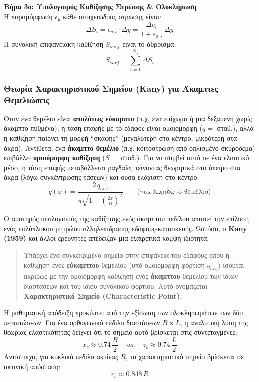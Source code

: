 \documentclass[11pt,a4paper]{article}
\begin{document}
\textbf{Βήμα 3ο: Υπολογισμός Καθίζησης Στρώσης \& Ολοκλήρωση}\\
Η παραμόρφωση $\epsilon_y$ κάθε στοιχειώδους στρώσης είναι:
\begin{equation}
  \Delta S_i = \epsilon_{y,i}\cdot\Delta y = \frac{\Delta e_i}{1+e_{0,i}}\,\Delta y
\end{equation}
Η συνολική επιφανειακή καθίζηση $S_{surf}$ είναι το άθροισμα:
\begin{equation}
  S_{surf} = \sum_{i=1}^{N_y} \Delta S_i
\end{equation}

\subsubsection{Θεωρία Χαρακτηριστικού Σημείου (Kany) για Άκαμπτες Θεμελιώσεις}\label{sec:kany}

Όταν ένα θεμέλιο είναι \textbf{απολύτως εύκαμπτο} (π.χ. ένα επίχωμα ή μια δεξαμενή χωρίς άκαμπτο πυθμένα), η τάση επαφής με το έδαφος είναι ομοιόμορφη ($q =$ σταθ.), αλλά η καθίζηση παίρνει τη μορφή ``σκάφης'' (μεγαλύτερη στο κέντρο, μικρότερη στα άκρα). Αντίθετα, ένα \textbf{άκαμπτο θεμέλιο} (π.χ. κοιτόστρωση από οπλισμένο σκυρόδεμα) επιβάλλει \textbf{ομοιόμορφη καθίζηση} ($S =$ σταθ.). Για να συμβεί αυτό σε ένα ελαστικό μέσο, η τάση επαφής μεταβάλλεται ραγδαία, τείνοντας θεωρητικά στο άπειρο στα άκρα (λόγω συγκέντρωσης τάσεων) και ούσα ελάχιστη στο κέντρο:
\begin{equation}
  q(x) = \frac{2\,q_{avg}}{\pi\sqrt{1-\left(\frac{2x}{B}\right)^2}} \qquad \text{(για λωριδωτό θεμέλιο)}
\end{equation}

Ο αυστηρός υπολογισμός της καθίζησης ενός άκαμπτου πεδίλου απαιτεί την επίλυση ενός πολύπλοκου μητρώου αλληλεπίδρασης εδάφους-κατασκευής. Ωστόσο, ο \textbf{Kany (1959)} και άλλοι ερευνητές απέδειξαν μια εξαιρετικά κομψή ιδιότητα:
\begin{quote}
  Υπάρχει ένα συγκεκριμένο σημείο στην επιφάνεια του εδάφους όπου η καθίζηση ενός \textbf{εύκαμπτου} θεμελίου (υπό ομοιόμορφη φόρτιση $q_{avg}$) ισούται ακριβώς με την ομοιόμορφη καθίζηση ενός \textbf{άκαμπτου} θεμελίου των ίδιων διαστάσεων και του ίδιου συνολικού φορτίου. Αυτό ονομάζεται \textbf{Χαρακτηριστικό Σημείο (Characteristic Point)}.
\end{quote}

Η μαθηματική απόδειξη προκύπτει από την εξίσωση των ολοκληρωμάτων των δύο περιπτώσεων. Για ένα ορθογωνικό πέδιλο διαστάσεων $B\times L$, η αναλυτική λύση της θεωρίας ελαστικότητας δείχνει ότι το σημείο αυτό βρίσκεται στις συντεταγμένες:
\begin{equation}
  x_c \approx 0.74\,\frac{B}{2} \quad \text{και} \quad z_c \approx 0.74\,\frac{L}{2}
\end{equation}
Αντίστοιχα, για κυκλικό πέδιλο ακτίνας $R$, το χαρακτηριστικό σημείο βρίσκεται σε ακτινική απόσταση:
\begin{equation}
  r_c \approx 0.848\,R
\end{equation}
\end{document}
